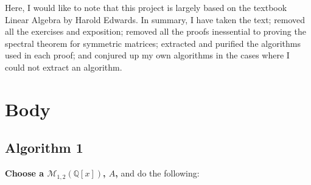 \documentclass[twocolumn]{article}
\begin{document}
		Here, I would like to note that this project is largely based on the textbook Linear Algebra by Harold Edwards. In summary, I have taken the text; removed all the exercises and exposition; removed all the proofs inessential to proving the spectral theorem for symmetric matrices; extracted and purified the algorithms used in each proof; and conjured up my own algorithms in the cases where I could not extract an algorithm.
	\tableofcontents
	\section{Body}\label{sec:body}
		\subsection{Algorithm 1}\label{sec:algorithm 1}
			\textbf{Choose a $\mathcal{M}_{1,2}(\mathbb{Q}[x])$, $A$,} and do the following:
\end{document}
